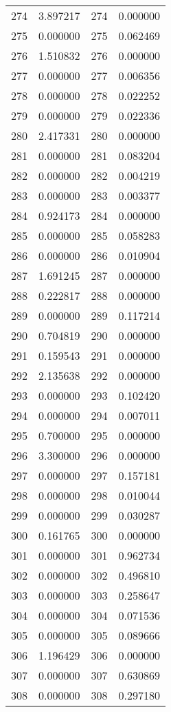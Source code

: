 \documentclass[12pt]{article}
\begin{document}
\begin{longtable}{@{}cccc@{}}
274 & 3.897217 & 274 & 0.000000 \\
275 & 0.000000 & 275 & 0.062469 \\
276 & 1.510832 & 276 & 0.000000 \\
277 & 0.000000 & 277 & 0.006356 \\
278 & 0.000000 & 278 & 0.022252 \\
279 & 0.000000 & 279 & 0.022336 \\
280 & 2.417331 & 280 & 0.000000 \\
281 & 0.000000 & 281 & 0.083204 \\
282 & 0.000000 & 282 & 0.004219 \\
283 & 0.000000 & 283 & 0.003377 \\
284 & 0.924173 & 284 & 0.000000 \\
285 & 0.000000 & 285 & 0.058283 \\
286 & 0.000000 & 286 & 0.010904 \\
287 & 1.691245 & 287 & 0.000000 \\
288 & 0.222817 & 288 & 0.000000 \\
289 & 0.000000 & 289 & 0.117214 \\
290 & 0.704819 & 290 & 0.000000 \\
291 & 0.159543 & 291 & 0.000000 \\
292 & 2.135638 & 292 & 0.000000 \\
293 & 0.000000 & 293 & 0.102420 \\
294 & 0.000000 & 294 & 0.007011 \\
295 & 0.700000 & 295 & 0.000000 \\
296 & 3.300000 & 296 & 0.000000 \\
297 & 0.000000 & 297 & 0.157181 \\
298 & 0.000000 & 298 & 0.010044 \\
299 & 0.000000 & 299 & 0.030287 \\
300 & 0.161765 & 300 & 0.000000 \\
301 & 0.000000 & 301 & 0.962734 \\
302 & 0.000000 & 302 & 0.496810 \\
303 & 0.000000 & 303 & 0.258647 \\
304 & 0.000000 & 304 & 0.071536 \\
305 & 0.000000 & 305 & 0.089666 \\
306 & 1.196429 & 306 & 0.000000 \\
307 & 0.000000 & 307 & 0.630869 \\
308 & 0.000000 & 308 & 0.297180 \\

\end{longtable}
\end{document}
